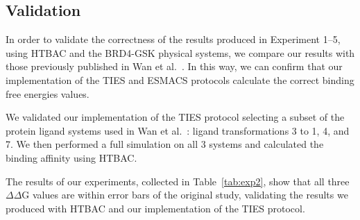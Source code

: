 
\subsection{Validation}

In order to validate the correctness of the results produced in Experiment
1--5, using HTBAC and the BRD4-GSK physical systems, we compare our results
with those previously published in Wan et al.~\cite{Wan2017brd4}. In this
way, we can confirm that our implementation of the TIES and ESMACS protocols
calculate the correct binding free energies values.

We validated our implementation of the TIES protocol selecting a subset of
the protein ligand systems used in Wan et al.~\cite{Wan2017brd4}: ligand
transformations 3 to 1, 4, and 7. We then performed a full simulation on all
3 systems and calculated the binding affinity using HTBAC.

The results of our experiments, collected in Table~\ref{tab:exp2}, show that
all three $\Delta \Delta$G values are within error bars of the original
study, validating the results we produced with HTBAC and our implementation
of the TIES protocol.

